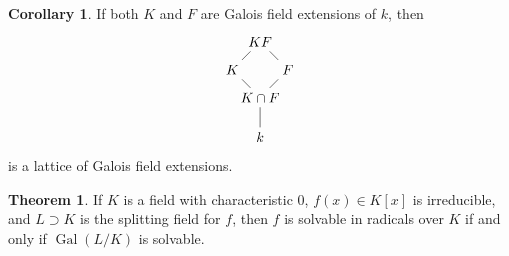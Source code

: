\documentclass[10pt,letterpaper,cm]{nupset}
\theoremstyle{definition}
\theoremstyle{theorem}
\newtheorem{theorem}[definition]{Theorem}
\newtheorem{corollary}[definition]{Corollary}
\theoremstyle{remark}
\newcommand{\1}{\mathbf{1}}
\newcommand{\0}{\vec 0}
\DeclareMathOperator{\gal}{Gal}
\begin{document}
\begin{corollary}
If both $K$ and $F$ are Galois field extensions of $k$, then
\[
\begin{tikzpicture}
\node (top) at (0,0) {$KF$};	
\node  [below left of=top] (l) {$K$};
\node [below right of=top] (r)  {$F$};
\node  [below right of=l] (c) {$K\cap F$};
\node [below of=c] (c')  {$k$};

\draw (top) -- (l);
\draw (top) -- (r);
\draw (l) -- (c);
\draw (r) -- (c);
\draw (c) -- (c');
\end{tikzpicture}
\]
is a lattice of Galois field extensions.
\end{corollary}

\begin{theorem}
If $K$ is a field with characteristic $0$, $f(x) \in K[x]$ is irreducible, and $L \supset K$ is the splitting field for $f$, then  $f$ is solvable in radicals over $K$ if and only if $\gal(L/K)$ is solvable. 
\end{theorem}
\end{document}

